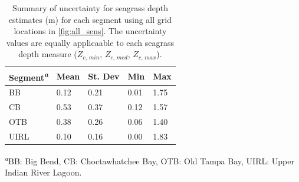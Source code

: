 \documentclass[letterpaper,12pt,oneside]{article}\usepackage[]{graphicx}\usepackage[]{color}
\begin{document}
\begin{table}[!tbp]
\caption{Summary of uncertainty for seagrass depth estimates (m) for each segment using all grid locations in \cref{fig:all_sens}.  The uncertainty values are equally applicaable to each seagrass depth measure ($Z_{c,\,min}$, $Z_{c,\,med}$, $Z_{c,\,max}$).\label{tab:sens_summ}} 
\begin{center}
\begin{tabular}{lllll}
\hline\hline
\multicolumn{1}{l}{Segment\textsuperscript{\textit{a}}}&\multicolumn{1}{c}{Mean}&\multicolumn{1}{c}{St. Dev}&\multicolumn{1}{c}{Min}&\multicolumn{1}{c}{Max}\tabularnewline
\hline
BB&0.12&0.21&0.01&1.75\tabularnewline
CB&0.53&0.37&0.12&1.57\tabularnewline
OTB&0.38&0.26&0.06&1.40\tabularnewline
UIRL&0.10&0.16&0.00&1.83\tabularnewline
\hline
\end{tabular}\end{center}

\textsuperscript{\textit{a}}\footnotesize BB: Big Bend, CB: Choctawhatchee Bay, OTB: Old Tampa Bay, UIRL: Upper Indian River Lagoon.\end{table}
\end{document}

